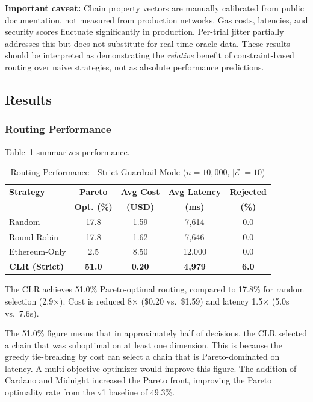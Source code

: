 \documentclass[conference, 10pt, twocolumn]{IEEEtran}
\begin{document}
\textbf{Important caveat:} Chain property vectors are manually
calibrated from public documentation, not measured from production
networks.  Gas costs, latencies, and security scores fluctuate
significantly in production.  Per-trial jitter partially addresses
this but does not substitute for real-time oracle data.  These results
should be interpreted as demonstrating the \emph{relative} benefit of
constraint-based routing over naive strategies, not as absolute
performance predictions.

\subsection{Results}

\subsubsection{Routing Performance}

Table~\ref{tab:results} summarizes performance.

\begin{table}[t]
\centering
\caption{Routing Performance---Strict Guardrail Mode ($n = 10{,}000$, $|\mathcal{E}|=10$)}
\label{tab:results}
\begin{tabular}{lcccc}
\toprule
\textbf{Strategy} & \textbf{Pareto} & \textbf{Avg Cost} & \textbf{Avg Latency} & \textbf{Rejected} \\
 & \textbf{Opt. (\%)} & \textbf{(USD)} & \textbf{(ms)} & \textbf{(\%)} \\
\midrule
Random        & 17.8 & 1.59 & 7{,}614 & 0.0 \\
Round-Robin   & 17.8 & 1.62 & 7{,}646 & 0.0 \\
Ethereum-Only &  2.5 & 8.50 & 12{,}000 & 0.0 \\
\textbf{CLR (Strict)}  & \textbf{51.0} & \textbf{0.20} & \textbf{4{,}979} & \textbf{6.0} \\
\bottomrule
\end{tabular}
\end{table}

The CLR achieves 51.0\% Pareto-optimal routing, compared to 17.8\%
for random selection (2.9$\times$).  Cost is reduced 8$\times$
(\$0.20 vs.\ \$1.59) and latency 1.5$\times$ (5.0s vs.\ 7.6s).

The 51.0\% figure means that in approximately half of decisions, the
CLR selected a chain that was suboptimal on at least one dimension.
This is because the greedy tie-breaking by cost can select a chain
that is Pareto-dominated on latency.  A multi-objective optimizer
would improve this figure.  The addition of Cardano and Midnight
increased the Pareto front, improving the Pareto optimality rate from
the v1 baseline of 49.3\%.
\end{document}
